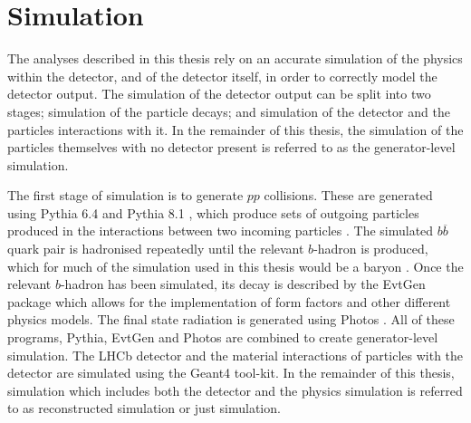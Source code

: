 \section{Simulation}
The analyses described in this thesis rely on an accurate simulation of the physics within the detector, and of the detector itself, in order to correctly model the detector output. The simulation of the detector output can be split into two stages; simulation of the particle decays; and simulation of the detector and the particles interactions with it. In the remainder of this thesis, the simulation of the particles themselves with no detector present is referred to as the generator-level simulation.

The first stage of simulation is to generate $pp$ collisions. These are generated using Pythia 6.4\cite{pythia6} and Pythia 8.1 \cite{pythia8}, which produce sets of outgoing particles produced in the interactions between two incoming particles \cite{pythia6}. The simulated $b\overline{b}$ quark pair is hadronised repeatedly until the relevant $b$-hadron is produced, which for much of  the simulation used in this thesis would be a \Lb baryon \cite{Sam}. Once the relevant $b$-hadron has been simulated, its decay is described by the EvtGen package \cite{Lange:2001uf} which allows for the implementation of form factors and other different physics models. The final state radiation is generated using Photos \cite{photos}. All of these programs, Pythia, EvtGen and Photos are combined to create generator-level simulation. The LHCb detector and the material interactions of particles with the detector are simulated using the Geant4 \cite{Geant4} tool-kit. In the remainder of this thesis, simulation which includes both the detector and the physics simulation is referred to as reconstructed simulation or just simulation.         


\clearpage
